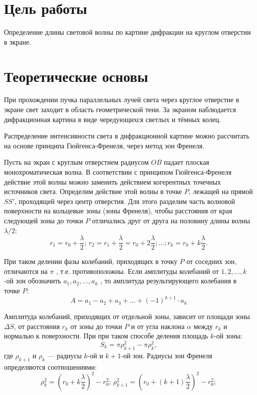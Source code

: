 \documentclass[12pt]{article}
\begin{document}
    \section*{Цель работы}

    Определение длины световой волны по картине дифракции на круглом отверстии в экране.

    \section*{Теоретические основы}

    При прохождении пучка параллельных лучей света через круглое отверстие в экране свет заходит в область геометрической тени. За экраном наблюдается дифракционная картина в виде чередующихся светлых и тёмных колец. 

	Распределение интенсивности света в дифракционной картине можно рассчитать на основе принципа Гюйгенса-Френеля,  через метод зон Френеля.

    Пусть на экран с круглым отверстием радиусом $ OB $ падает плоская монохроматическая волна. В соответствии с принципом Гюйгенса-Френеля действие этой волны можно заменить действием когерентных точечных источников света. Определим действие этой волны в точке $ P $, лежащей на прямой $ SS' $, проходящей через центр отверстия. Для этого разделим часть волновой поверхности на кольцевые зоны (зоны Френеля), чтобы расстояния от края следующей зоны до точки $ P $ отличались друг от друга на половину длины волны $ \lambda/2 $:
    \begin{equation}
        \label{eq:lam}
        r_1 = r_0 + \frac{\lambda}{2}; \, r_2 = r_1 + \frac{\lambda}{2} = r_0 + 2 \frac{\lambda}{2}; \dots ; r_k = r_0 + k \frac{\lambda}{2}.
    \end{equation}

    При таком делении фазы колебаний, приходящих в точку $ P $ от соседних зон, отличаются на $ \pi $ , т.е. противоположны. Если амплитуды колебаний от $ 1, 2, \dots,k $-ой зон обозначить $ a_1, a_2, \dots , a_k $ , то амплитуда результирующего колебания в точке $ P $:
    \begin{equation}
        \label{eq:a}
        A = a_1 - a_2 + a_3 + \dots + (-1)^{k+1} \cdot a_k
    \end{equation}

    Амплитуда колебаний, приходящих от отдельной зоны, зависит от площади зоны $ \Delta S $, от расстояния $ r_k $ от зоны до точки $ P $ и от угла наклона $ \alpha $  между $ r_k $ и нормалью к поверхности. При при таком способе деления площадь $ k $-ой зоны:
    \begin{equation}
        \label{eq:s}
        S_k = \pi \rho^2_{k+1} - \pi \rho^2_{k} ,
    \end{equation}
    где $ \rho_{k+1} $ и $ \rho_{k} $ --- радиусы $ k $-ой и $ k + 1 $-ой зон. Радиусы зон Френеля определяются соотношениями:
    \begin{equation}
        \label{eq:r}
        \rho^2_{k} = (r_0 + k \frac{\lambda}{2})^2 - r^2_0; \, \rho^2_{k+1} = (r_0 + (k + 1)\frac{\lambda}{2})^2 - r^2_0;
    \end{equation}
\end{document}
